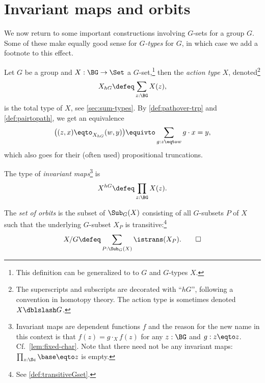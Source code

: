 


\section{Invariant maps and orbits}
\label{sec:fixpts-orbits}
We now return to some important constructions involving $G$-sets 
for a group $G$.
Some of these make equally good sense for \emph{$G$-types} for \aninftygp
$G$, in which case we add a footnote to this effect.


\begin{definition}\label{def:actiontype} 
  Let $G$ be a group and $X : \BG\to\Set$ a $G$-set,\footnote{%
  This definition can be generalized to to \inftygps $G$ and $G$-types $X$.}
  then the \emph{action type}
  $X$, denoted\footnote{%
    The superscripts and subscripts are decorated with ``$hG$'',
    following a convention in homotopy theory.
    The action type is sometimes denoted $X \dblslash G$.}
\[
  X_{hG} \defeq \sum_{z:\BG} X(z),
\]
is the total type of $X$, see \cref{sec:sum-types}.
By \cref{def:pathover-trp} and \cref{def:pairtopath},
we get an equivalence
\[
\bigl((z,x)\eqto_{X_{hG}}(w,y)\bigr) \equivto
\sum_{g:z\eqto w} g\cdot x = y,
\]
which also goes for their (often used) propositional truncations.

The type of \emph{invariant maps}\footnote{%
Invariant maps are dependent functions $f$ and the reason for the new name
in this context is that $f(z) = g \cdot_X f(z)$ for any $z:\BG$
and $g:z\eqto z$. Cf.~\cref{lem:fixed-char}. Note that there need not 
be any invariant maps: $\prod_{z:\Sc}\base\eqto z$ is empty.}
 is
\[
  X^{hG} \defeq \prod_{z:\BG} X(z).
\]

The \emph{set of orbits}
 is the subset of $\Sub_G(X)$ consisting
of all $G$-subsets $P$ of $X$ such that the underlying $G$-subset $X_P$
is transitive:\footnote{See \cref{def:transitiveGset}.}
\[
  X / G \defeq \sum_{P:\Sub_G(X)}\istrans(X_P).\qedhere
\]
\end{definition}

